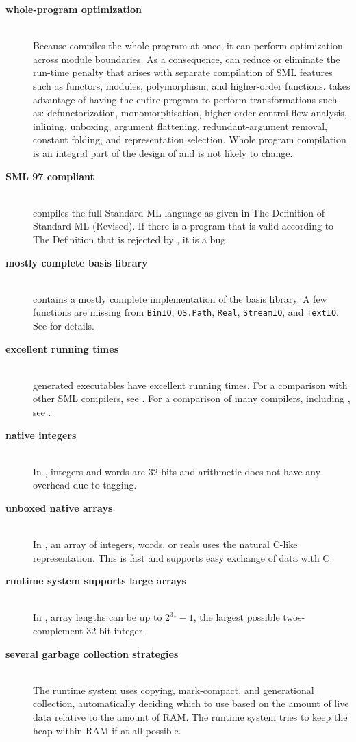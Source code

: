 
\newcommand{\feature}[1]{\item[\bf #1]\hspace{1in}\\}
\begin{description}
\feature{whole-program optimization}
Because {\mlton} compiles the whole program at once, it can perform optimization
across module boundaries.  As a consequence, {\mlton} can reduce or eliminate
the run-time penalty that arises with separate compilation of SML features such
as functors, modules, polymorphism, and higher-order functions.  {\mlton} takes
advantage of having the entire program to perform transformations such as:
defunctorization, monomorphisation, higher-order control-flow analysis,
inlining, unboxing, argument flattening, redundant-argument removal, constant
folding, and representation selection.  Whole program compilation is an integral
part of the design of {\mlton} and is not likely to change.

\feature{SML 97 compliant}
{\mlton} compiles the full Standard ML language as given in The
Definition of Standard ML (Revised)\cite{MTHM97}.  If there is a
program that is valid according to The Definition that is rejected by
{\mlton}, it is a bug.

\feature{mostly complete basis library}
{\mlton} contains a mostly complete implementation of the basis
library.  A few functions are missing from {\tt BinIO}, {\tt OS.Path},
{\tt Real}, {\tt StreamIO}, and {\tt TextIO}.  See
 for details.

\feature{excellent running times}
{\mlton} generated executables have excellent running times.
For a comparison with other SML compilers, see
.
For a comparison of many compilers, including {\mlton}, see
.

\feature{native integers}
In {\mlton}, integers and words are 32 bits and arithmetic does not have
any overhead due to tagging.

\feature{unboxed native arrays}
In {\mlton}, an array of integers, words, or reals uses the natural C-like
representation.  This is fast and supports easy exchange of data with C.

\feature{runtime system supports large arrays}
In {\mlton}, array lengths can be up to $2^{31} - 1$, the largest possible
twos-complement 32 bit integer.

\feature{several garbage collection strategies}
The {\mlton} runtime system uses copying, mark-compact, and generational
collection, automatically deciding which to use based on the amount of live
data relative to the amount of RAM.  The runtime system tries to keep the heap
within RAM if at all possible.


\end{description}
